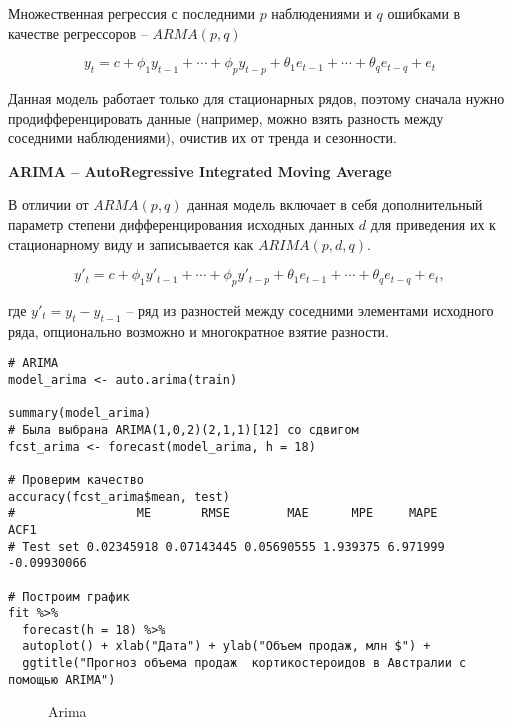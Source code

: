 \documentclass[a4paper,12pt]{article}
\theoremstyle{plain} %
\theoremstyle{definition} %
\theoremstyle{remark} %
\begin{document}
  Множественная регрессия с последними $p$ наблюдениями и $q$ ошибками в качестве регрессоров -- $ARMA(p,q)$

  \begin{equation}
  y_{t} = c + \phi_{1}y_{t-1} + \cdots + \phi_{p}y_{t-p}
     + \theta_{1}e_{t-1} + \cdots + \theta_{q}e_{t-q} + e_{t}
  \end{equation}

  Данная модель работает только для стационарных рядов, поэтому сначала нужно продифференцировать данные (например, можно взять разность между соседними наблюдениями), очистив их от тренда и сезонности.

  \vspace{2ex}

  \noindent\textbf{ARIMA -- AutoRegressive Integrated Moving Average}

  В отличии от $ARMA(p,q)$ данная модель включает в себя дополнительный параметр степени дифференцирования исходных данных $d$ для приведения их к стационарному виду и записывается как $ARIMA(p,d,q)$.


  \begin{equation}
  y'_{t} = c + \phi_{1}y'_{t-1} + \cdots + \phi_{p}y'_{t-p}
     + \theta_{1}e_{t-1} + \cdots + \theta_{q}e_{t-q} + e_{t},
\end{equation}

где $y'_{t} = y_{t} - y_{t-1}$ -- ряд из разностей между соседними элементами исходного ряда, опционально возможно и многократное взятие разности.

\begin{verbatim}
# ARIMA
model_arima <- auto.arima(train)

summary(model_arima)
# Была выбрана ARIMA(1,0,2)(2,1,1)[12] со сдвигом
fcst_arima <- forecast(model_arima, h = 18)

# Проверим качество
accuracy(fcst_arima$mean, test)
#                 ME       RMSE        MAE      MPE     MAPE        ACF1
# Test set 0.02345918 0.07143445 0.05690555 1.939375 6.971999 -0.09930066

# Построим график
fit %>%
  forecast(h = 18) %>%
  autoplot() + xlab("Дата") + ylab("Объем продаж, млн $") +
  ggtitle("Прогноз объема продаж  кортикостероидов в Австралии с помощью ARIMA")

\end{verbatim}

\begin{figure}[H]
  \noindent{}
  \caption{Arima}
  \label{figCurves}
\end{figure}
\end{document}
